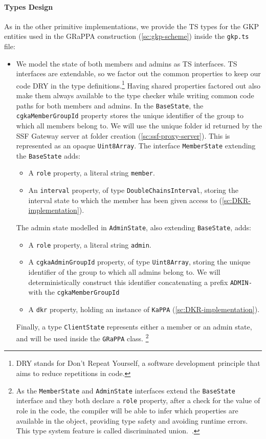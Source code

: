 \paragraph{Types Design}
As in the other primitive implementations,
we provide the TS types for the GKP entities used 
in the GRaPPA construction (\cref{sc:gkp-scheme}) inside the \texttt{gkp.ts} file:
\begin{itemize}
    \item We model the state of both members and admins as TS interfaces. 
    TS interfaces are extendable, so we factor out the common
    properties to keep our code DRY in the type definitions.\footnote{DRY stands for Don't Repeat Yourself, a software development principle that aims to reduce repetitions in code.}
    Having shared properties factored out also make them always
    available to the type checker while writing common code paths for both members and admins.
    In the \texttt{BaseState}, the \texttt{cgkaMemberGroupId} property stores the unique identifier of the group to which all members belong to. We will use the unique folder id returned by the SSF Gateway server at folder creation (\cref{sc:ssf-proxy-server}). This is represented as an opaque \texttt{Uint8Array}. 
    The interface \texttt{MemberState} extending the \texttt{BaseState} adds:
    \begin{itemize}
        \item A \texttt{role} property, a literal string \texttt{member}.
        \item An \texttt{interval} property, of type \texttt{DoubleChainsInterval}, storing the interval state to which the member has been given access to (\cref{sc:DKR-implementation}).
    \end{itemize}
    The admin state modelled in \texttt{AdminState}, also extending \texttt{BaseState}, adds:
    \begin{itemize}
        \item A \texttt{role} property, a literal string \texttt{admin}.
        \item A \texttt{cgkaAdminGroupId} property, of type \texttt{Uint8Array}, storing the unique identifier of the group to which all admins belong to. We will deterministically construct this identifier concatenating a prefix \texttt{ADMIN-} with the \texttt{cgkaMemberGroupId} 
        \item A \texttt{dkr} property, holding an instance of \texttt{KaPPA} (\cref{sc:DKR-implementation}).
    \end{itemize}
    Finally, a type \texttt{ClientState} represents either a member or an admin state, and will be used
    inside the \texttt{GRaPPA} class.
    \footnote{As the \texttt{MemberState} and \texttt{AdminState} interfaces 
    extend the \texttt{BaseState} interface and they both declare 
    a \texttt{role} property, after a check for the value of role in the code,
    the compiler will be able to infer which properties are available in the object, 
    providing type safety and avoiding runtime errors. This type system feature is called discriminated union.~\cite{TSDisciminatedUnions}.}
    

\end{itemize}
